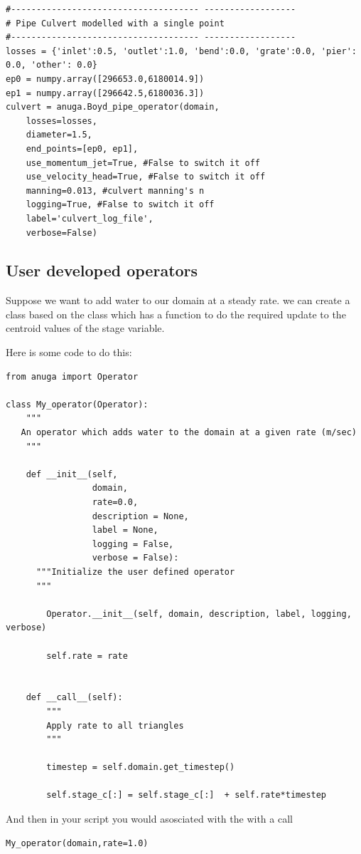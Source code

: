 \documentclass{manual}
\begin{document}
\begin{verbatim}
#------------------------------------- ------------------
# Pipe Culvert modelled with a single point 
#------------------------------------- ------------------
losses = {'inlet':0.5, 'outlet':1.0, 'bend':0.0, 'grate':0.0, 'pier': 0.0, 'other': 0.0} 
ep0 = numpy.array([296653.0,6180014.9]) 
ep1 = numpy.array([296642.5,6180036.3])      
culvert = anuga.Boyd_pipe_operator(domain, 
    losses=losses, 
    diameter=1.5, 
    end_points=[ep0, ep1], 
    use_momentum_jet=True, #False to switch it off
    use_velocity_head=True, #False to switch it off
    manning=0.013, #culvert manning's n
    logging=True, #False to switch it off
    label='culvert_log_file', 
    verbose=False) 
\end{verbatim}

\subsection{User developed operators}

Suppose we want to add water to our domain at a steady rate. we can create a class based on the  class which has a  function to do the required update to the centroid values of the stage variable.

Here is some code to do this:
\begin{verbatim}
from anuga import Operator

class My_operator(Operator):
    """
   An operator which adds water to the domain at a given rate (m/sec)
    """

    def __init__(self,
                 domain,
                 rate=0.0,
                 description = None,
                 label = None,
                 logging = False,
                 verbose = False):
	  """Initialize the user defined operator
	  """

        Operator.__init__(self, domain, description, label, logging, verbose)
       
        self.rate = rate


    def __call__(self):
        """
        Apply rate to all triangles 
        """

        timestep = self.domain.get_timestep()

        self.stage_c[:] = self.stage_c[:]  + self.rate*timestep
\end{verbatim}

And then in your script you would asosciated  with the  with a call 
\begin{verbatim}
My_operator(domain,rate=1.0)
\end{verbatim}
\end{document}
